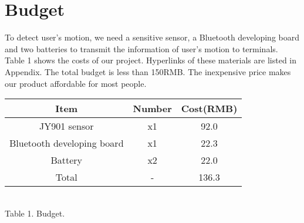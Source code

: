 \section{Budget}
To detect user's motion, we need a sensitive sensor, a Bluetooth developing
board and two batteries to transmit the information of user's motion to
terminals. 
Table 1 shows the costs of our project.
Hyperlinks of these materials are listed in Appendix. 
The total budget is less than 150RMB.
The inexpensive price makes our product affordable for most people. 

\begin{center}
\begin{tabular}{|ccc|}
\hline Item&Number&Cost(RMB)\\
\hline JY901 sensor&x1&92.0\\
\hline Bluetooth developing board&x1&22.3\\
\hline Battery&x2&22.0\\
\hline Total&-&136.3\\
\hline
\end{tabular}
\vspace{0.5em}
~\\Table 1. Budget.\\
\end{center}
